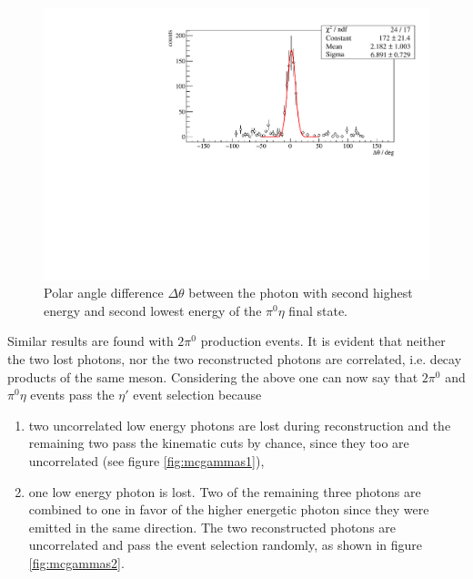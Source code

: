 \begin{figure}[htbp]
	\centering
	\includegraphics[width=\linewidth]{../figs/hydrogen/mcgammas_td_pi0eta.pdf}
	\caption{Polar angle difference $\Delta\theta$ between the photon with second highest energy and second lowest energy of the $\pi^0\eta$ final state.}
	\label{fig:mcangle}
\end{figure}
Similar results are found with $2\pi^0$ production events. It is evident that neither the two lost photons, nor the two reconstructed photons are correlated, i.e. decay products of the same meson.
\newpage
Considering the above one can now say that $2\pi^0$ and $\pi^0\eta$ events pass the $\eta'$ event selection because 
\begin{enumerate}
	\item two uncorrelated low energy photons are lost during reconstruction and the remaining two pass the kinematic cuts by chance, since they too are uncorrelated (see figure \ref{fig:mcgammas1}),

	\item one low energy photon is lost. Two of the remaining three photons are combined to one in favor of the higher energetic photon since they were emitted in the same direction. The two reconstructed photons are uncorrelated and pass the event selection randomly, as shown in figure \ref{fig:mcgammas2}.
\end{enumerate} 
